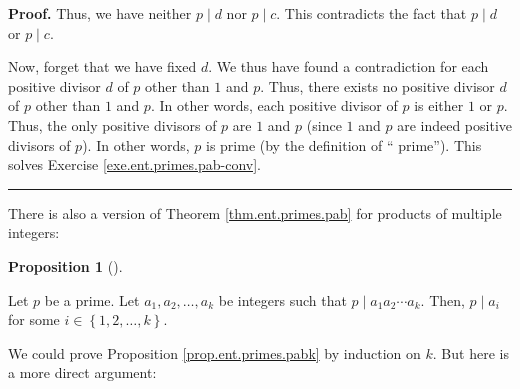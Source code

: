 \documentclass[numbers=enddot,12pt,final,onecolumn,notitlepage]{scrartcl}%
\numberwithin{exer}{subsection}
\theoremstyle{definition}
\newtheorem{prop}[theo]{Proposition}
\newenvironment{proposition}[1][]
{\begin{prop}[#1]\begin{leftbar}}
{\end{leftbar}\end{prop}}
\newenvironment{fineprint}{\begin{small}}{\end{small}}
\newenvironment{proof}[1][Proof]{\noindent\textbf{#1.} }{\ \rule{0.5em}{0.5em}}
\begin{document}
\begin{fineprint}
\begin{proof}
Thus, we have neither $p\mid d$ nor $p\mid c$. This contradicts the fact that
$p\mid d$ or $p\mid c$.

Now, forget that we have fixed $d$. We thus have found a contradiction for
each positive divisor $d$ of $p$ other than $1$ and $p$. Thus, there exists no
positive divisor $d$ of $p$ other than $1$ and $p$. In other words, each
positive divisor of $p$ is either $1$ or $p$. Thus, the only positive divisors
of $p$ are $1$ and $p$ (since $1$ and $p$ are indeed positive divisors of
$p$). In other words, $p$ is prime (by the definition of \textquotedblleft
prime\textquotedblright). This solves Exercise \ref{exe.ent.primes.pab-conv}.
\end{proof}
\end{fineprint}

There is also a version of Theorem \ref{thm.ent.primes.pab} for products of
multiple integers:

\begin{proposition}
\label{prop.ent.primes.pabk}Let $p$ be a prime. Let $a_{1},a_{2},\ldots,a_{k}$
be integers such that $p\mid a_{1}a_{2}\cdots a_{k}$. Then, $p\mid a_{i}$ for
some $i\in\left\{  1,2,\ldots,k\right\}  $.
\end{proposition}

We could prove Proposition \ref{prop.ent.primes.pabk} by induction on $k$. But
here is a more direct argument:
\end{document}
